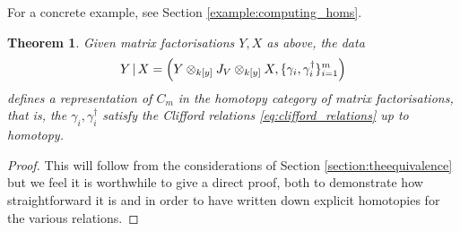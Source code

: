 \documentclass[english,letter paper,12pt,leqno]{article}
\newtheorem{theorem}{Theorem}[section]
\theoremstyle{example}
\numberwithin{equation}{section}
\def\be{\begin{equation}}
\def\ee{\end{equation}}
\def\ferm{\gamma}
\def\fermc{\gamma^\dagger}
\begin{document}
For a concrete example, see Section \ref{example:computing_homs}.

\begin{theorem}\label{theorem:cut_is_rep} Given matrix factorisations $Y,X$ as above, the data
\be
Y \l X = \left( Y \otimes_{k[y]} J_V \otimes_{k[y]} X, \{ \ferm_i, \fermc_i \}_{i=1}^m \right)
\ee
defines a representation of $C_m$ in the homotopy category of matrix factorisations, that is, the $\ferm_i, \fermc_i$ satisfy the Clifford relations \eqref{eq:clifford_relations}
up to homotopy.
\end{theorem}
\begin{proof}
This will follow from the considerations of Section \ref{section:theequivalence} but we feel it is worthwhile to give a direct proof, both to demonstrate how straightforward it is and in order to have written down explicit homotopies for the various relations.


\end{proof}
\end{document}
